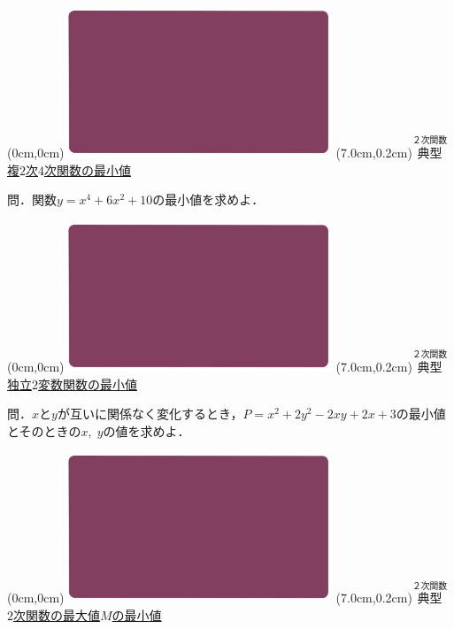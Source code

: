 \documentclass[10pt,
fleqn,
dvipdfmx,
uplatex
]{jsarticle}
\begin{document}
\at(0cm,0cm){\includegraphics[width=8cm,bb=0 0 1920 1080]{./youtube/thumbnails/templates/smart_background/２次関数.jpeg}}
\at(7.0cm,0.2cm){\small\color{bradorange}$\overset{\text{２次関数}}{\text{典型}}$}
{\color{orange}\LARGE\underline{複$2$次$4$次関数の最小値}}\vspace{0.3zw}

\huge 
問．関数$y=x^4+6x^2+{10}$の最小値を求めよ．


\newpage



\at(0cm,0cm){\includegraphics[width=8cm,bb=0 0 1920 1080]{./youtube/thumbnails/templates/smart_background/２次関数.jpeg}}
\at(7.0cm,0.2cm){\small\color{bradorange}$\overset{\text{２次関数}}{\text{典型}}$}
{\color{orange}\LARGE\underline{独立$2$変数関数の最小値}}\vspace{0.3zw}

\Large 
問．$x$と$y$が互いに関係なく変化するとき，$P=x^2+2y^2-2xy+2x+3$の最小値とそのときの$x,\;y$の値を求めよ．


\newpage



\at(0cm,0cm){\includegraphics[width=8cm,bb=0 0 1920 1080]{./youtube/thumbnails/templates/smart_background/２次関数.jpeg}}
\at(7.0cm,0.2cm){\small\color{bradorange}$\overset{\text{２次関数}}{\text{典型}}$}
{\color{orange}\Large\underline{$2$次関数の最大値$M$の最小値}}\vspace{0.3zw}
\end{document}
